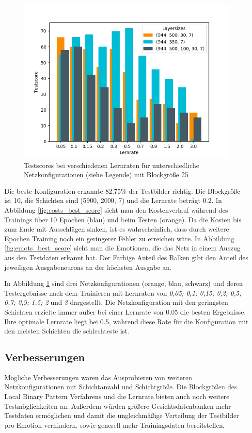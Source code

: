 \documentclass[12pt, a4paper]{article}
\begin{document}
\begin{figure}[p]
	\centering
	\includegraphics[width=1\textwidth]{learningrate_score}
	\caption{Testscores bei verschiedenen Lernraten für unterschiedliche Netzkonfigurationen (siehe Legende) mit Blockgröße 25}
	\label{fig:learningrate_score}
\end{figure}

Die beste Konfiguration erkannte 82,75\% der Testbilder richtig. Die Blockgröße ist 10, die Schichten sind (5900, 2000, 7) und die Lernrate beträgt 0.2. In Abbildung \ref{fig:costs_best_score} sieht man den Kostenverlauf während des Trainings über 10 Epochen (blau) und beim Testen (orange). Da die Kosten bis zum Ende mit Ausschlägen sinken, ist es wahrscheinlich, dass durch weitere Epochen Training noch ein geringerer Fehler zu erreichen wäre. In Abbildung \ref{fig:emots_best_score} sieht man die Emotionen, die das Netz in einem Auszug aus den Testdaten erkannt hat. Der Farbige Anteil des Balken gibt den Anteil des jeweiligen Ausgabeneurons an der höchsten Ausgabe an.

In Abbildung \ref{fig:learningrate_score} sind drei Netzkonfigurationen (orange, blau, schwarz) und deren Testergebnisse nach dem Trainieren mit Lernraten von \textit{0,05; 0,1; 0,15; 0,2; 0,5; 0,7; 0,9; 1,5; 2} und \textit{3} dargestellt. Die Netzkonfiguration mit den geringsten Schichten erzielte immer außer bei einer Lernrate von 0.05 die besten Ergebnisse. Ihre optimale Lernrate liegt bei 0.5, während diese Rate für die Konfiguration mit den meisten Schichten die schlechteste ist.

\subsection{Verbesserungen}
Mögliche Verbesserungen wären das Ausprobieren von weiteren Netzkonfigurationen mit Schichtanzahl und Schichtgröße. Die Blockgrößen des Local Binary Pattern Verfahrens und die Lernrate bieten auch noch weitere Testmöglichkeiten an. Außerdem würden größere Gesichtsdatenbanken mehr Testdaten ermöglichen und damit die ungleichmäßige Verteilung der Testbilder pro Emotion verhindern, sowie generell mehr Trainingsdaten bereitstellen.
\end{document}
